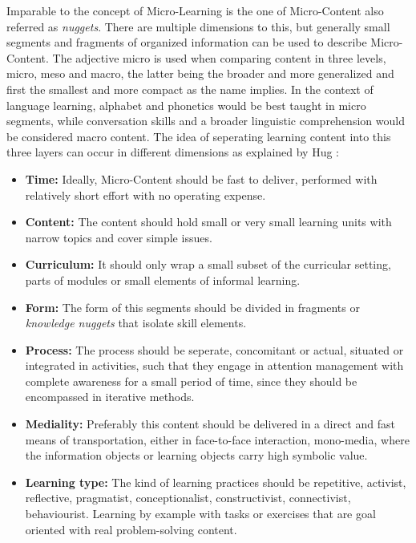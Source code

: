 Imparable to the concept of Micro-Learning is the one of Micro-Content also referred as
\textit{nuggets}. There are 
multiple dimensions to this, but generally small segments and fragments of organized
information can be used to describe Micro-Content.
The adjective micro is used when comparing content in three levels, micro, meso and
macro, the latter being the broader and more generalized and first the smallest and 
more compact as the name implies. In the context of language learning, alphabet and
phonetics would be best taught in micro segments, while conversation skills and 
a broader linguistic comprehension would be considered macro content.
The idea of seperating learning content into this three layers can occur in different
dimensions as explained by Hug \cite{microlearningdimensions}:

\begin{itemize}
    \item \textbf{Time:} 
        Ideally, Micro-Content should be fast to deliver, performed with relatively
        short effort with no operating expense.
    \item \textbf{Content:} The content should hold small or very small learning units
        with narrow topics and cover simple issues.
    \item \textbf{Curriculum:} 
        It should only wrap a small subset of the curricular setting, parts of modules
        or small elements of informal learning.
    \item \textbf{Form:} 
        The form of this segments should be divided in fragments or 
        \textit{knowledge nuggets} that isolate skill elements.
    \item \textbf{Process:} The process should be
        seperate, concomitant or actual, situated or integrated in activities, such
        that they engage in attention management with complete awareness for a small
        period of time, since they should be encompassed in iterative methods.
    \item \textbf{Mediality:} 
        Preferably this content should be delivered in a direct and fast means of
        transportation, either in face-to-face interaction, mono-media, where the
        information objects or learning objects carry high symbolic value.
    \item \textbf{Learning type:} 
        The kind of learning practices should be repetitive, activist, 
        reflective, pragmatist, 
        conceptionalist, 
        constructivist, connectivist, behaviourist. Learning by example with tasks
        or exercises that are goal oriented with real problem-solving content.
\end{itemize}



